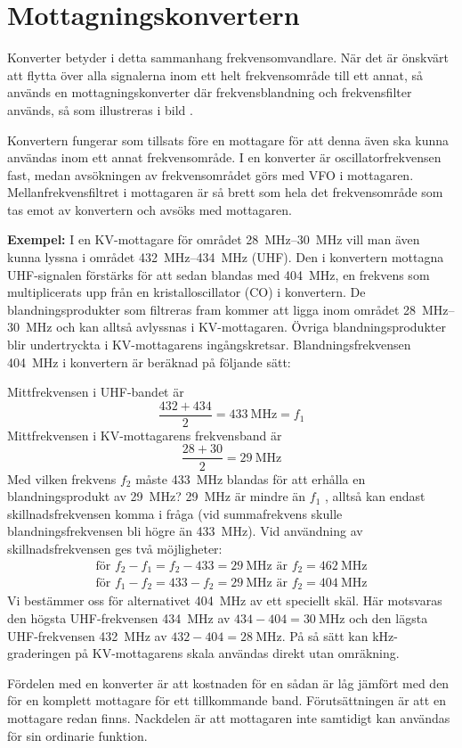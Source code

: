 \section{Mottagningskonvertern}


Konverter betyder i detta sammanhang frekvensomvandlare.
När det är önskvärt att flytta över alla signalerna inom ett helt frekvensområde
till ett annat, så används en mottagningskonverter där frekvensblandning och
frekvensfilter används, så som illustreras i bild .

Konvertern fungerar som tillsats före en mottagare för att denna även
ska kunna användas inom ett annat frekvensområde.
I en konverter är oscillatorfrekvensen fast, medan avsökningen av
frekvensområdet görs med VFO i mottagaren.
Mellanfrekvensfiltret i mottagaren är så brett som hela det frekvensområde
som tas emot av konvertern och avsöks med mottagaren.

\textbf{Exempel:}
I en KV-mottagare för området \SIrange{28}{30}{\mega\hertz} vill man även kunna
lyssna i området \SIrange{432}{434}{\mega\hertz} (UHF).
Den i konvertern mottagna UHF-signalen förstärks för att sedan blandas med
\qty{404}{\mega\hertz}, en frekvens som multiplicerats upp från en
kristalloscillator (CO) i konvertern.
De blandningsprodukter som filtreras fram kommer att ligga inom området
\SIrange{28}{30}{\mega\hertz} och kan alltså avlyssnas i KV-mottagaren.
Övriga blandningsprodukter blir undertryckta i KV-mottagarens ingångskretsar.
Blandningsfrekvensen \qty{404}{\mega\hertz} i konvertern är beräknad på följande
sätt:

\noindent
Mittfrekvensen i UHF-bandet är
\[\frac{432+434}{2} = \qty{433}{\mega\hertz} = f_1\]
Mittfrekvensen i KV-mottagarens frekvensband är
\[\frac{28 + 30}{2} = \qty{29}{\mega\hertz}\]
Med vilken frekvens \(f_2\) måste \qty{433}{\mega\hertz} blandas för att erhålla
en blandningsprodukt av \qty{29}{\mega\hertz}?
\qty{29}{\mega\hertz} är mindre än \(f_1\) , alltså kan endast
skillnadsfrekvensen komma i fråga (vid summafrekvens skulle blandningsfrekvensen
bli högre än \qty{433}{\mega\hertz}).
Vid användning av skillnadsfrekvensen ges två möjligheter:
\begin{gather*}
  \text{för }f_2 - f_1 = f_2 - 433 = \qty{29}{\mega\hertz}\text{ är }f_2 = \qty{462}{\mega\hertz} \\
  \text{för }f_1 - f_2 = 433 - f_2 = \qty{29}{\mega\hertz}\text{ är }f_2 = \qty{404}{\mega\hertz}
\end{gather*}
Vi bestämmer oss för alternativet \qty{404}{\mega\hertz} av ett speciellt skäl.
Här motsvaras den högsta UHF-frekvensen \qty{434}{\mega\hertz} av \(434 - 404 =
\qty{30}{\mega\hertz}\) och den lägsta UHF-frekvensen \qty{432}{\mega\hertz} av
\(432 - 404 = \qty{28}{\mega\hertz}\).
På så sätt kan kHz-graderingen på KV-mottagarens skala användas direkt utan
omräkning.

Fördelen med en konverter är att kostnaden för en sådan är låg jämfört
med den för en komplett mottagare för ett tillkommande band.
Förutsättningen är att en mottagare redan finns.
Nackdelen är att mottagaren inte samtidigt kan användas för sin
ordinarie funktion.
